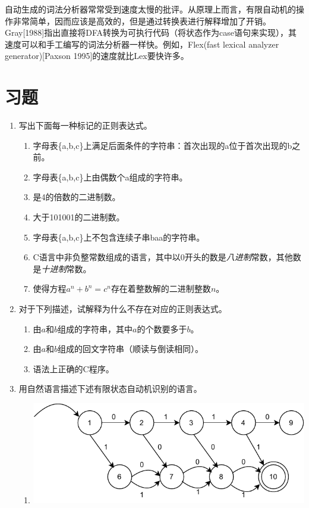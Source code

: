 \documentclass[cn,11pt,chinese]{elegantbook}
\begin{document}
自动生成的词法分析器常常受到速度太慢的批评。从原理上而言，有限自动机的操作非常简单，因而应该是高效的，但是通过转换表进行解释增加了开销。Gray[1988]指出直接将DFA转换为可执行代码（将状态作为case语句来实现），其速度可以和手工编写的词法分析器一样快。例如，Flex(fast lexical analyzer generator)[Paxson 1995]的速度就比Lex要快许多。

\section{习题}

\begin{enumerate}
  \item 写出下面每一种标记的正则表达式。
  \begin{enumerate}
    \item 字母表\{a,b,c\}上满足后面条件的字符串：首次出现的a位于首次出现的b之前。
    \item 字母表\{a,b,c\}上由偶数个a组成的字符串。
    \item 是4的倍数的二进制数。
    \item 大于101001的二进制数。
    \item 字母表\{a,b,c\}上不包含连续子串baa的字符串。
    \item C语言中非负整常数组成的语言，其中以0开头的数是\textit{八进制}常数，其他数是\textit{十进制}常数。
    \item 使得方程$a^n+b^n=c^n$存在着整数解的二进制整数$n$。
  \end{enumerate}
  \item 对于下列描述，试解释为什么不存在对应的正则表达式。
  \begin{enumerate}
    \item 由$a$和$b$组成的字符串，其中$a$的个数要多于$b$。
    \item 由$a$和$b$组成的回文字符串（顺读与倒读相同）。
    \item 语法上正确的C程序。
  \end{enumerate}
  \item 用自然语言描述下述有限状态自动机识别的语言。
  \begin{enumerate}
    \item \includegraphics[scale=0.6,valign=t]{exercise2.3-a.pdf}

\end{enumerate}
\end{enumerate}
\end{document}
